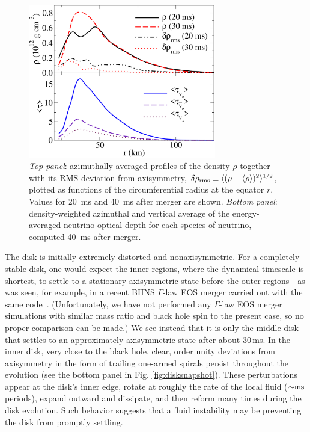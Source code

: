 \begin{figure}
\includegraphics[width=8.2cm]{Figures/thickness}
\caption[Radial profile of disk density and opacity]{{\em Top panel}: azimuthally-averaged profiles of the
density $\rho$ together with its RMS deviation from axisymmetry,
$\delta\rho_{\rm rms}\equiv \langle(\rho-\langle\rho\rangle)^2\rangle^{1/2}$,
plotted as functions of the circumferential radius
at the equator $r$.  Values for 20~ms and 40~ms after merger are shown.  
{\em Bottom panel}: density-weighted azimuthal and vertical average of
the energy-averaged neutrino optical depth for each species of neutrino,
computed 40~ms after merger.}
\label{fig:thickness}
\end{figure}

The disk is initially extremely distorted and nonaxisymmetric.  For
a completely stable disk, one would expect the inner regions, where
the dynamical timescale is shortest, to settle to a stationary
axisymmetric state before the outer regions---as was seen, for example,
in a recent BHNS $\Gamma$-law EOS merger carried out with the same
code~\citep{love2013-bhns_high_spin}.  (Unfortunately, we have not performed
any $\Gamma$-law EOS merger simulations with similar mass ratio and
black hole spin to the present case, so no proper comparison can be
made.)  We see instead that it is only the
middle disk that settles to an approximately axisymmetric state after
about 30\,ms. 
In the inner disk, very close to the black hole, clear, order unity
deviations from axisymmetry in the form of trailing one-armed spirals
persist throughout the evolution (see the bottom panel in Fig.
\ref{fig:disksnapshot}).  These perturbations appear at the
disk's inner edge, rotate at roughly the rate of the local fluid
($\mathord{\sim}\rm ms$ periods), expand outward and dissipate, and then reform
many times during the disk evolution.  Such behavior suggests that
a fluid instability may be preventing the disk from promptly settling.

